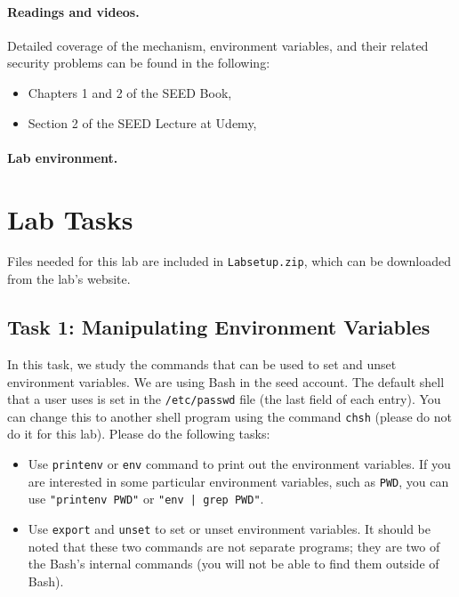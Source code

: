 \paragraph{Readings and videos.}
Detailed coverage of the \setuid mechanism, environment variables,
and their related security problems can be found in the following:

\begin{itemize}
\item Chapters 1 and 2 of the SEED Book, \seedbook
\item Section 2 of the SEED Lecture at Udemy, \seedcsvideo
\end{itemize}

\paragraph{Lab environment.} \seedenvironmentC





\section{Lab Tasks}

Files needed for this lab are included in \texttt{Labsetup.zip},
which can be downloaded from the lab's website. 


\subsection{Task 1: Manipulating Environment Variables}

In this task, we study the commands that can be used to set and unset
environment variables. We are using Bash in the seed account. The default
shell that a user uses is set in  the {\tt /etc/passwd} file (the last
field of each entry). You can change this to another shell program using
the command {\tt chsh} (please do not do it for this lab). Please
do the following tasks:

\begin{itemize}
\item Use {\tt printenv} or {\tt env} command to print out the
environment variables. If you are interested in some particular
environment variables, such as {\tt PWD}, you can use {\tt "printenv PWD"}
or {\tt "env | grep PWD"}.


\item Use {\tt export} and {\tt unset} to set or unset environment
variables. It should be noted that
these two commands are not separate programs; they are two of
the Bash's internal commands (you will not be able to find them
outside of Bash).

\end{itemize}





